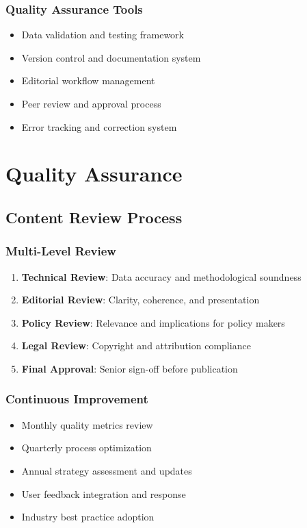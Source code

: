 \documentclass[11pt,a4paper]{article}
\begin{document}
\subsubsection{Quality Assurance Tools}
\begin{itemize}
    \item Data validation and testing framework
    \item Version control and documentation system
    \item Editorial workflow management
    \item Peer review and approval process
    \item Error tracking and correction system
\end{itemize}

\section{Quality Assurance}

\subsection{Content Review Process}

\subsubsection{Multi-Level Review}
\begin{enumerate}
    \item \textbf{Technical Review}: Data accuracy and methodological soundness
    \item \textbf{Editorial Review}: Clarity, coherence, and presentation
    \item \textbf{Policy Review}: Relevance and implications for policy makers
    \item \textbf{Legal Review}: Copyright and attribution compliance
    \item \textbf{Final Approval}: Senior sign-off before publication
\end{enumerate}

\subsubsection{Continuous Improvement}
\begin{itemize}
    \item Monthly quality metrics review
    \item Quarterly process optimization
    \item Annual strategy assessment and updates
    \item User feedback integration and response
    \item Industry best practice adoption
\end{itemize}
\end{document}
